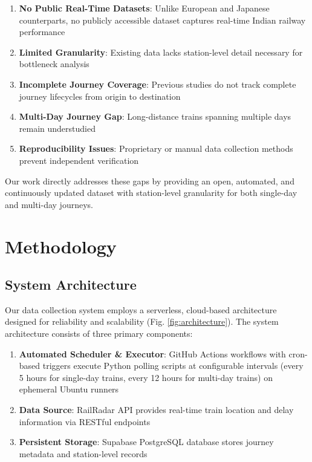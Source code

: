 \documentclass[conference]{IEEEtran}
\begin{document}
\begin{enumerate}
    \item \textbf{No Public Real-Time Datasets}: Unlike European and Japanese counterparts, no publicly accessible dataset captures real-time Indian railway performance
    \item \textbf{Limited Granularity}: Existing data lacks station-level detail necessary for bottleneck analysis
    \item \textbf{Incomplete Journey Coverage}: Previous studies do not track complete journey lifecycles from origin to destination
    \item \textbf{Multi-Day Journey Gap}: Long-distance trains spanning multiple days remain understudied
    \item \textbf{Reproducibility Issues}: Proprietary or manual data collection methods prevent independent verification
\end{enumerate}

Our work directly addresses these gaps by providing an open, automated, and continuously updated dataset with station-level granularity for both single-day and multi-day journeys.

\section{Methodology}

\subsection{System Architecture}

Our data collection system employs a serverless, cloud-based architecture designed for reliability and scalability (Fig. \ref{fig:architecture}). The system architecture consists of three primary components:

\begin{enumerate}
    \item \textbf{Automated Scheduler \& Executor}: GitHub Actions workflows with cron-based triggers execute Python polling scripts at configurable intervals (every 5 hours for single-day trains, every 12 hours for multi-day trains) on ephemeral Ubuntu runners
    \item \textbf{Data Source}: RailRadar API provides real-time train location and delay information via RESTful endpoints
    \item \textbf{Persistent Storage}: Supabase PostgreSQL database stores journey metadata and station-level records
\end{enumerate}
\end{document}

